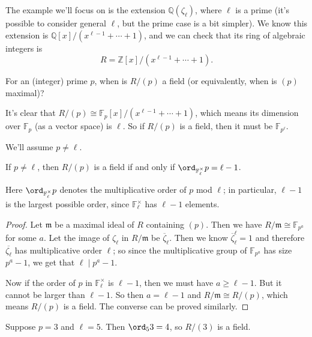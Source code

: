 The example we'll focus on is the extension $\mathbb{Q}(\zeta_\ell)$, where $\ell$ is a prime (it's possible to consider general $\ell$, but the prime case is a bit simpler). We know this extension is $\mathbb{Q}[x]/(x^{\ell - 1} + \cdots + 1)$, and we can check that its ring of algebraic integers is \[R = \mathbb{Z}[x]/(x^{\ell - 1} + \cdots + 1).\] 

\begin{qq}
For an (integer) prime $p$, when is $R/(p)$ a field (or equivalently, when is $(p)$ maximal)?
\end{qq}

It's clear that $R/(p) \cong \mathbb{F}_p[x]/(x^{\ell - 1} + \cdots + 1)$, which means its dimension over $\mathbb{F}_p$ (as a vector space) is $\ell$. So if $R/(p)$ is a field, then it must be $\mathbb{F}_{p^\ell}$. 

We'll assume $p \neq \ell$. 

\begin{proposition}
    If $p \neq \ell$, then $R/(p)$ is a field if and only if $\ord_{\mathbb{F}_\ell^\times} p = \ell - 1$.
\end{proposition}

Here $\ord_{\mathbb{F}_\ell^\times} p$ denotes the multiplicative order of $p$ mod $\ell$; in particular, $\ell - 1$ is the largest possible order, since $\mathbb{F}_\ell^\times$ has $\ell - 1$ elements. 

\begin{proof}
    Let $\mathfrak{m}$ be a maximal ideal of $R$ containing $(p)$. Then we have $R/\mathfrak{m} \cong \mathbb{F}_{p^a}$ for some $a$. Let the image of $\zeta_\ell$ in $R/\mathfrak{m}$ be $\overline{\zeta}_\ell$. Then we know $\overline{\zeta}_\ell^\ell = 1$ and therefore $\overline{\zeta_\ell}$ has multiplicative order $\ell$; so since the multiplicative group of  $\mathbb{F}_{p^a}$ has size $p^a - 1$, we get that $\ell \mid p^a - 1$. 

    Now if the order of $p$ in $\mathbb{F}_\ell^\times$ is $\ell - 1$, then we must have $a \geq \ell - 1$. But it cannot be larger than $\ell - 1$. So then $a = \ell - 1$ and $R/\mathfrak{m} \cong R/(p)$, which means $R/(p)$ is a field. The converse can be proved similarly. 
\end{proof}

\begin{example}
    Suppose $p = 3$ and $\ell = 5$. Then $\ord_5 3 = 4$, so $R/(3)$ is a field. 
\end{example}

